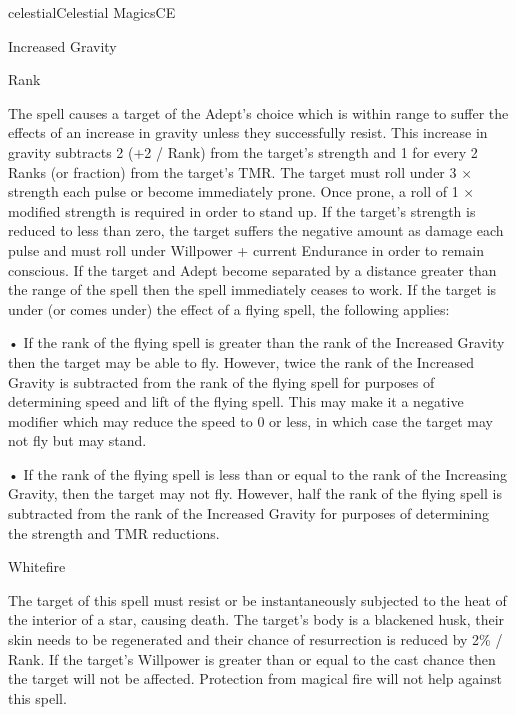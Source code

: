 \begin{College}[1.3]{celestial}{Celestial Magics}{CE}
\begin{spell}[S-8]{Increased Gravity }

Rank 
\begin{effects}
The spell causes a target of the Adept’s choice which is within range
to suffer the effects of an increase in gravity unless they
successfully resist.  This increase in gravity subtracts 2 (+2 / Rank)
from the target’s strength and 1 for every 2 Ranks (or fraction) from
the target’s TMR.  The target must roll under 3 × strength each pulse
or become immediately prone. Once prone, a roll of 1 × modified
strength is required in order to stand up.  If the target’s strength
is reduced to less than zero, the target suffers the negative amount
as damage each pulse and must roll under Willpower + current Endurance
in order to remain conscious.  If the target and Adept become
separated by a distance greater than the range of the spell then the
spell immediately ceases to work.  If the target is under (or comes
under) the effect of a flying spell, the following applies:

• If the rank of the flying spell is greater than the rank of the
Increased Gravity then the target may be able to fly.  However, twice
the rank of the Increased Gravity is subtracted from the rank of the
flying spell for purposes of determining speed and lift of the flying
spell. This may make it a negative modifier which may reduce the speed
to 0 or less, in which case the target may not fly but may stand.

• If the rank of the flying spell is less than or equal to the rank of
the Increasing Gravity, then the target may not fly.  However, half
the rank of the flying spell is subtracted from the rank of the
Increased Gravity for purposes of determining the strength and TMR
reductions.
\end{effects}
\end{spell}

\begin{spell}[S-9]{Whitefire}

\begin{effects}
The target of this spell must resist or be instantaneously subjected
to the heat of the interior of a star, causing death.  The target’s
body is a blackened husk, their skin needs to be regenerated and their
chance of resurrection is reduced by 2\% / Rank.  If the target’s
Willpower is greater than or equal to the cast chance then the target
will not be affected. Protection from magical fire will not help
against this spell.
\end{effects}
\end{spell}


\end{College}
